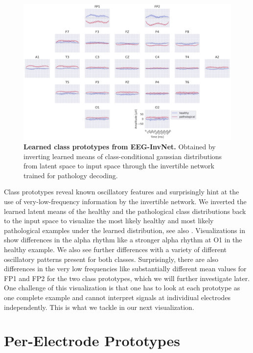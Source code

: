 \begin{figure}[h!tb]
    \myfloatalign
    \includegraphics[width=.9\linewidth]{images/net-disc-prototypes.png}
    \caption[Learned class prototypes from EEG-InvNet]{
\textbf{Learned class prototypes from EEG-InvNet.} Obtained by inverting
learned means of class-conditional gaussian distributions from latent
space to input space through the invertible network trained for
pathology decoding.
}
\label{disc-invnet-prototypes}
\end{figure}



    Class prototypes reveal known oscillatory features and surprisingly hint
at the use of very-low-frequency information by the invertible network.
We inverted the learned latent means of the healthy and the pathological
class distributions back to the input space to visualize the most likely
healthy and most likely pathological examples under the learned
distribution, see also .
Visualizations in  show
differences in the alpha rhythm like a stronger alpha rhythm at O1 in
the healthy example. We also see further differences with a variety of
different oscillatory patterns present for both classes. Surprisingly,
there are also differences in the very low frequencies like
substantially different mean values for FP1 and FP2 for the two class
prototypes, which we will further investigate later. One challenge of
this visualization is that one has to look at each prototype as one
complete example and cannot interpret signals at individiual electrodes
independently. This is what we tackle in our next visualization.

\section{Per-Electrode Prototypes}\label{per-channel-prototypes}

